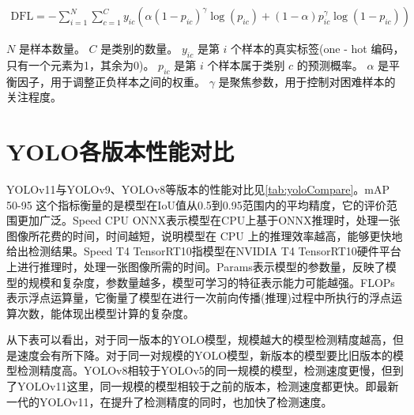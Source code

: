 \begin{equation}
  \begin{aligned}
    \text{DFL} = - \sum_{i = 1}^{N} \sum_{c = 1}^{C} y_{ic} \left( \alpha (1 - p_{ic})^{\gamma} \log(p_{ic}) + (1 - \alpha) p_{ic}^{\gamma} \log(1 - p_{ic}) \right) \label{eq:dfl}
  \end{aligned}
\end{equation}

$N$ 是样本数量。
$C$ 是类别的数量。
$y_{ic}$ 是第 $i$ 个样本的真实标签(one - hot 编码，只有一个元素为1，其余为0)。
$p_{ic}$ 是第 $i$ 个样本属于类别 $c$ 的预测概率。
$\alpha$ 是平衡因子，用于调整正负样本之间的权重。
$\gamma$ 是聚焦参数，用于控制对困难样本的关注程度。

\section{YOLO各版本性能对比}
YOLOv11与YOLOv9、YOLOv8等版本的性能对比见\ref{tab:yoloCompare}。mAP 50-95 这个指标衡量的是模型在IoU值从0.5到0.95范围内的平均精度，它的评价范围更加广泛。Speed CPU ONNX表示模型在CPU上基于ONNX推理时，处理一张图像所花费的时间，时间越短，说明模型在 CPU 上的推理效率越高，能够更快地给出检测结果。Speed T4 TensorRT10指模型在NVIDIA T4 TensorRT10硬件平台上进行推理时，处理一张图像所需的时间。Params表示模型的参数量，反映了模型的规模和复杂度，参数量越多，模型可学习的特征表示能力可能越强。FLOPs表示浮点运算量，它衡量了模型在进行一次前向传播(推理)过程中所执行的浮点运算次数，能体现出模型计算的复杂度。

从下表可以看出，对于同一版本的YOLO模型，规模越大的模型检测精度越高，但是速度会有所下降。对于同一对规模的YOLO模型，新版本的模型要比旧版本的模型检测精度高。YOLOv8相较于YOLOv5的同一规模的模型，检测速度更慢，但到了YOLOv11这里，同一规模的模型相较于之前的版本，检测速度都更快。即最新一代的YOLOv11，在提升了检测精度的同时，也加快了检测速度。

